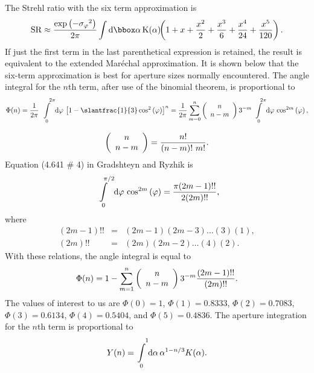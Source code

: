 The
Strehl ratio with the six term approximation is
\begin{eqnarray}{\rm   SR} \approx  {{\exp \left( {-\sigma
_\varphi} ^2 \right)} \over {2\pi }}\int {\rm d{\bbox  \alpha}
\,K(\alpha )\,}\kern-.5em\left( {1+x+{{x^2} \over 2}+{{x^3} \over 6}+{{x^4}
\over {24}}+{{x^5} \over {120}}} \right).\end{eqnarray}  If just
the  first term in the last parenthetical expression  is retained,
the result is equivalent to  the extended Mar\'{e}chal
approximation.  It is shown below that the six-term  approximation
is best for aperture sizes normally encountered.   The angle
integral for the $n$th term, after use of the binomial theorem,  is
proportional to  \begin{eqnarray}\Phi (n)={1 \over {2\pi
}}\int\limits_{\,\,\, 0}^{\,\,\,\,\,\,\,\, 2\pi } {\rm d}\varphi \,\left[
{1-\slantfrac{1}{3}} \cos ^2\left( \varphi  \right) \right]^n={1
\over {2\pi  }}\sum\limits_{m=0}^n {\left( \begin{array}{c} n \\
n-m\end{array}  \right)}\,3^{-m}\int\limits_{\,\,\, 0}^{\,\,\,\,\,\, 2\pi
} {\rm d\varphi }\, \cos ^{2m}\left( \varphi
\right),\end{eqnarray}

\begin{eqnarray}\left(
\begin{array}{c} n \\ n-m \end{array} \right)={{n!} \over {\left(
{n-m} \right)!\,\,m!}}.\end{eqnarray}  Equation (4.641 \# 4) in
Gradshteyn  and Ryzhik\cite{8} is
\begin{eqnarray}\int\limits_{\,\,\, 0}^{\,\,\,\,\,\, \pi /  2}{\rm
d\varphi \,}\cos ^{2m}\left( \varphi  \right)={{\pi (2m-1)!!} \over
{2(2m)!!}},\end{eqnarray}   where
\begin{eqnarray}(2m-1)!!&=&(2m-1)(2m-3)\ldots (3)(1), \\
(2m)!!&=&(2m)(2m-2)\ldots (4)(2).\end{eqnarray}  With these
relations, the angle integral is equal to
\begin{eqnarray}\Phi (n)=1-\sum\limits_{m=1}^n {\left(
\begin{array}{c}n \\  n-m \end{array} \right)}\,3^{-m}{{(2m-1)!!}
\over {(2m)!!}}.\end{eqnarray}  The values of interest to us are
$\Phi (0) = 1$, $\Phi (1) = 0.8333$, $\Phi (2) = 0.7083$, $ \Phi
(3) = 0.6134$, $\Phi (4) = 0.5404$, and  $\Phi (5) = 0.4836$.   The
aperture integration for the $n$th term is proportional to
\begin{eqnarray}Y(n)=\int\limits_{\,\,\, 0}^{\,\,\,\,\,\, 1} {\rm d\alpha
\,}\alpha ^{1-n/ 3}K(\alpha ).\end{eqnarray}

